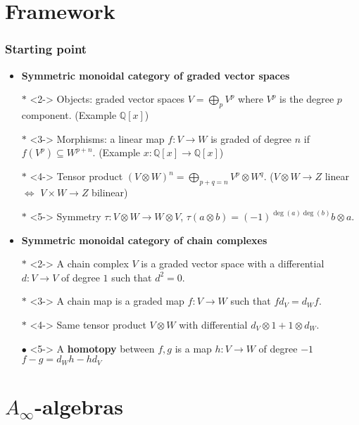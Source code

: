 \documentclass{beamer}
\theoremstyle{definition}
\newcommand{\Q}{\mathbb{Q}}
\begin{document}
\section{Framework}
\begin{frame}
\frametitle{Starting point}
\begin{itemize}
\item<1-> \textbf{Symmetric monoidal category of graded vector spaces} \item[$\ast$]<2-> Objects: graded vector spaces $V=\bigoplus_p V^p$ where $V^p$ is the degree $p$ component. (Example $\Q[x]$)
\item[$\ast$]<3-> Morphisms: a linear map $f:V\to W$ is graded of degree $n$ if $f(V^p)\subseteq W^{p+n}$. (Example $x:\Q[x]\to \Q[x]$)
\item[$\ast$]<4-> Tensor product $(V\otimes W)^n=\bigoplus_{p+q=n} V^p\otimes W^q$. ($V\otimes W\to Z$ linear $\Leftrightarrow$ $V\times W\to Z$ bilinear)
\item[$\ast$]<5-> Symmetry $\tau:V\otimes W\to W\otimes V$, $\tau(a\otimes b)=(-1)^{\deg(a)\deg(b)}b\otimes a$.
\end{itemize}
\end{frame}

\begin{frame}
\begin{itemize}
\item<1-> \textbf{Symmetric monoidal category of chain complexes}
\item[$\ast$]<2-> A chain complex $V$ is a graded vector space with a differential $d:V\to V$ of degree $1$ such that $d^2=0$.
\item[$\ast$]<3-> A chain map is a graded map $f:V\to W$ such that $fd_V=d_Wf$.
\item[$\ast$]<4-> Same tensor product $V\otimes W$ with differential $d_V\otimes 1+1\otimes d_W$. %

\item[$\bullet$]<5-> A \textbf{homotopy} between $f,g$ is a map $h:V\to W$ of degree $-1$ $f-g=d_Wh-hd_V$ %
\end{itemize}
\end{frame}

\section{$A_\infty$-algebras}
\end{document}
